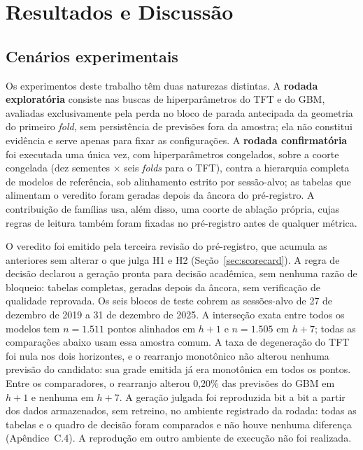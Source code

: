 \chapter{Resultados e Discussão} \label{chap:resultados}


\section{Cenários experimentais}
Os experimentos deste trabalho têm duas naturezas distintas. A \textbf{rodada exploratória} consiste nas buscas de hiperparâmetros do TFT e do GBM, avaliadas exclusivamente pela perda no bloco de parada antecipada da geometria do primeiro \textit{fold}, sem persistência de previsões fora da amostra; ela não constitui evidência e serve apenas para fixar as configurações. A \textbf{rodada confirmatória} foi executada uma única vez, com hiperparâmetros congelados, sobre a coorte congelada (dez sementes \(\times\) seis \textit{folds} para o TFT), contra a hierarquia completa de modelos de referência, sob alinhamento estrito por sessão-alvo; as tabelas que alimentam o veredito foram geradas depois da âncora do pré-registro. A contribuição de famílias usa, além disso, uma coorte de ablação própria, cujas regras de leitura também foram fixadas no pré-registro antes de qualquer métrica.

O veredito foi emitido pela terceira revisão do pré-registro, que acumula as anteriores sem alterar o que julga H1 e H2 (Seção~\ref{sec:scorecard}). A regra de decisão declarou a geração pronta para decisão acadêmica, sem nenhuma razão de bloqueio: tabelas completas, geradas depois da âncora, sem verificação de qualidade reprovada. Os seis blocos de teste cobrem as sessões-alvo de 27 de dezembro de 2019 a 31 de dezembro de 2025. A interseção exata entre todos os modelos tem \(n = 1.511\) pontos alinhados em \(h+1\) e \(n = 1.505\) em \(h+7\); todas as comparações abaixo usam essa amostra comum. A taxa de degeneração do TFT foi nula nos dois horizontes, e o rearranjo monotônico não alterou nenhuma previsão do candidato: sua grade emitida já era monotônica em todos os pontos. Entre os comparadores, o rearranjo alterou 0,20\% das previsões do GBM em \(h+1\) e nenhuma em \(h+7\). A geração julgada foi reproduzida bit a bit a partir dos dados armazenados, sem retreino, no ambiente registrado da rodada: todas as tabelas e o quadro de decisão foram comparados e não houve nenhuma diferença (Apêndice~C.4). A reprodução em outro ambiente de execução não foi realizada.

